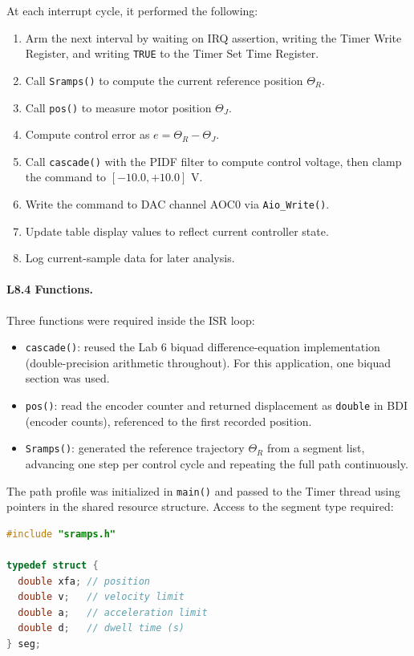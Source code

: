 \documentclass[10pt,twocolumn]{article}
\begin{document}
At each interrupt cycle, it performed the following:
\begin{enumerate}
	\item Arm the next interval by waiting on IRQ assertion, writing the Timer Write Register, and writing \texttt{TRUE} to the Timer Set Time Register.
	\item Call \texttt{Sramps()} to compute the current reference position $\Theta_R$.
	\item Call \texttt{pos()} to measure motor position $\Theta_J$.
	\item Compute control error as $e = \Theta_R - \Theta_J$.
	\item Call \texttt{cascade()} with the PIDF filter to compute control voltage, then clamp the command to $[-10.0, +10.0]$ V.
	\item Write the command to DAC channel AOC0 via \texttt{Aio\_Write()}.
	\item Update table display values to reflect current controller state.
	\item Log current-sample data for later analysis.
\end{enumerate}

\paragraph{L8.4 Functions.}
Three functions were required inside the ISR loop:
\begin{itemize}
	\item \texttt{cascade()}: reused the Lab 6 biquad difference-equation implementation (double-precision arithmetic throughout). For this application, one biquad section was used.
	\item \texttt{pos()}: read the encoder counter and returned displacement as \texttt{double} in BDI (encoder counts), referenced to the first recorded position.
	\item \texttt{Sramps()}: generated the reference trajectory $\Theta_R$ from a segment list, advancing one step per control cycle and repeating the full path continuously.
\end{itemize}

The path profile was initialized in \texttt{main()} and passed to the Timer thread using pointers in the shared resource structure. Access to the segment type required:
\begin{lstlisting}[language=C]
#include "sramps.h"

typedef struct {
  double xfa; // position
  double v;   // velocity limit
  double a;   // acceleration limit
  double d;   // dwell time (s)
} seg;
\end{lstlisting}
\end{document}
